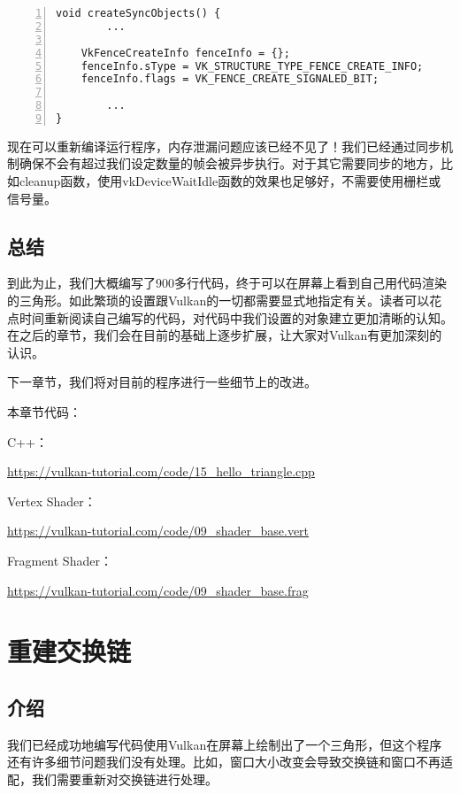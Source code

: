 \documentclass{ctexart}
\begin{document}
\begin{lstlisting}[language={[ANSI]C},keywordstyle=\color{blue!70},commentstyle=\color{red!50!green!50!blue!50},frame=shadowbox, rulesepcolor=\color{red!20!green!20!blue!20},basicstyle=\small,numbers=left, numberstyle=\tiny,breaklines=true]
void createSyncObjects() {
		...

	VkFenceCreateInfo fenceInfo = {};
	fenceInfo.sType = VK_STRUCTURE_TYPE_FENCE_CREATE_INFO;
	fenceInfo.flags = VK_FENCE_CREATE_SIGNALED_BIT;

		...
}
\end{lstlisting}

现在可以重新编译运行程序，内存泄漏问题应该已经不见了！我们已经通过同步机制确保不会有超过我们设定数量的帧会被异步执行。对于其它需要同步的地方，比如cleanup函数，使用vkDeviceWaitIdle函数的效果也足够好，不需要使用栅栏或信号量。

\subsection{总结}

到此为止，我们大概编写了900多行代码，终于可以在屏幕上看到自己用代码渲染的三角形。如此繁琐的设置跟Vulkan的一切都需要显式地指定有关。读者可以花点时间重新阅读自己编写的代码，对代码中我们设置的对象建立更加清晰的认知。在之后的章节，我们会在目前的基础上逐步扩展，让大家对Vulkan有更加深刻的认识。

下一章节，我们将对目前的程序进行一些细节上的改进。

本章节代码：

C++：

\url{https://vulkan-tutorial.com/code/15_hello_triangle.cpp}

Vertex Shader：

\url{https://vulkan-tutorial.com/code/09_shader_base.vert}

Fragment Shader：

\url{https://vulkan-tutorial.com/code/09_shader_base.frag}

\newpage
\section{重建交换链}

\subsection{介绍}

我们已经成功地编写代码使用Vulkan在屏幕上绘制出了一个三角形，但这个程序还有许多细节问题我们没有处理。比如，窗口大小改变会导致交换链和窗口不再适配，我们需要重新对交换链进行处理。
\end{document}
